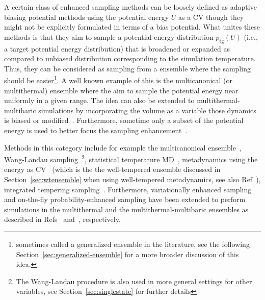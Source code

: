 \documentclass[9pt,review]{livecoms}
\begin{document}
A certain class of enhanced sampling methods can be loosely defined as adaptive biasing potential methods using the potential energy $U$ as a CV though they might not be explicitly formulated in terms of a bias potential. What unites these methods is that they aim to sample a potential energy distribution $p_{\mathrm{tg}}(U)$ (i.e., a target potential energy distribution) that is broadened or expanded as compared to unbiased distribution corresponding to the simulation temperature. Thus, they can be considered as sampling from a ensemble where the sampling should be easier\footnote{sometimes called a generalized ensemble in the literature, see the following Section~\ref{sec:generalized-ensemble} for a more broader discussion of this idea.}. A well known example of this is the multicanonical (or multithermal) ensemble where the aim to sample the potential energy near uniformly in a given range. The idea can also be extended to multithermal-multibaric simulations by incorporating the volume as a variable those dynamics is biased or modified~\cite{Okumura_MultiTP_2004,Shell_MultiTP_2002}. Furthermore, sometime only a subset of the potential energy is used to better focus the sampling enhancement~\cite{Yang_SITS_2009}.

Methods in this category include for example
the multicanonical ensemble~\cite{Berg1992_Multicanonical},
Wang-Landau sampling~\cite{wang-landau:prl:2001:wang-landau}\footnote{The Wang-Landau procedure is also used in more general settings for other variables, see Section~\ref{sec:singlestate} for further details},
statistical temperature MD~\cite{Kim2006_PRL_STMD},
metadynamics using the energy as CV~\cite{Micheletti_MetaE_Energy_2004,Bonomi-PRL-2010}
(which is the the well-tempered ensemble discussed in Section~\ref{sec:wtensemble} when using well-tempered metadynamics, see also Ref~\cite{Valsson-JCTC-2013}),
integrated tempering sampling~\cite{Gao_ITS_2008,Gao_ITS_Review_2015}.
Furthermore, variationally enhanced sampling and on-the-fly probability-enhanced sampling have been extended to perform simulations in the multithermal and the multithermal-multibaric ensembles as described in Refs~\citep{Piaggi_MultiVES_2019,Piaggi_MultiVES+CV_2019} and~\citep{invernizzi2020unified}, respectively.
\end{document}

